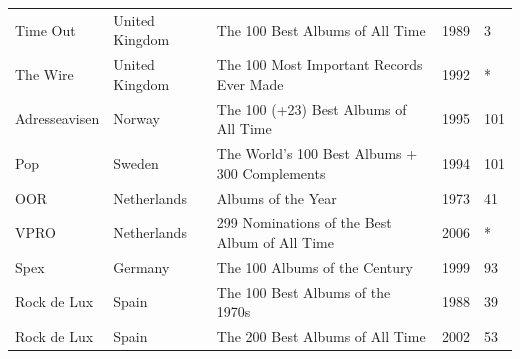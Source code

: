 \documentclass{article}
\begin{document}
\begin{tabular}{lllll}
Time Out & United Kingdom & The 100 Best Albums of All Time & 1989 & 3 \\
The Wire & United Kingdom & The 100 Most Important Records Ever Made & 1992 & * \\
Adresseavisen & Norway & The 100 (+23) Best Albums of All Time & 1995 & 101 \\
Pop & Sweden & The World's 100 Best Albums + 300 Complements & 1994 & 101 \\
OOR & Netherlands & Albums of the Year & 1973 & 41 \\
VPRO & Netherlands & 299 Nominations of the Best Album of All Time & 2006 & * \\
Spex & Germany & The 100 Albums of the Century & 1999 & 93 \\
Rock de Lux & Spain & The 100 Best Albums of the 1970s & 1988 & 39 \\
Rock de Lux & Spain & The 200 Best Albums of All Time & 2002 & 53 \\
\bottomrule
\end{tabular}
\end{document}
